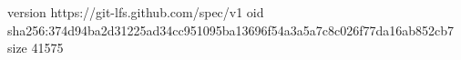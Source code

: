 version https://git-lfs.github.com/spec/v1
oid sha256:374d94ba2d31225ad34cc951095ba13696f54a3a5a7c8c026f77da16ab852cb7
size 41575
